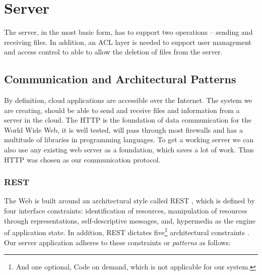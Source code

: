 \documentclass[pdftex,english,10pt,b5paper,twoside]{book}
\begin{document}
\section{Server}

The server, in the most basic form, has to support two operations -- sending
and receiving files. In addition, an \ac{ACL} layer is needed to support user
management and access control to able to allow the deletion of files from the
server.

\subsection{Communication and Architectural Patterns}

By definition, cloud applications are accessible over the Internet. The system
we are creating, should be able to send and receive files and information from
a server in the cloud. The \acf{HTTP} is the foundation of data communication
for the World Wide Web, it is well tested, will pass through most firewalls and
has a multitude of libraries in programming languages. To get a working server
we can also use any existing web server as a foundation, which saves a lot of
work. Thus \ac{HTTP} was chosen as our communication protocol.

\subsubsection{\acs{REST}} The Web is built around an architectural style called
\ac{REST} \cite[ch. 5]{fielding}, which is defined by four interface
constraints: identification of resources, manipulation of resources through
representations, self-descriptive messages, and, hypermedia as the engine of
application state. In addition, \ac{REST} dictates five\footnote{And one
optional, Code on demand, which is not applicable for our system.} architectural
constraints \cite{fielding}. Our server application adheres to these
constraints or \emph{patterns} as follows:
\end{document}
